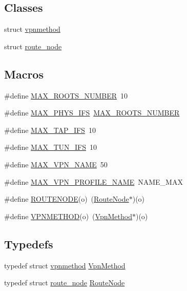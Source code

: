 \subsection*{Classes}
\begin{DoxyCompactItemize}
\item 
struct \hyperlink{structvpnmethod}{vpnmethod}
\item 
struct \hyperlink{structroute__node}{route\+\_\+node}
\end{DoxyCompactItemize}
\subsection*{Macros}
\begin{DoxyCompactItemize}
\item 
\#define \hyperlink{route-tree_8h_a8e1da3af3417de420798c8b448b6a8cb}{M\+A\+X\+\_\+\+R\+O\+O\+T\+S\+\_\+\+N\+U\+M\+B\+ER}~10
\item 
\#define \hyperlink{route-tree_8h_a5f66955385e84e67789d731b5cad24c7}{M\+A\+X\+\_\+\+P\+H\+Y\+S\+\_\+\+I\+FS}~\hyperlink{route-tree_8h_a8e1da3af3417de420798c8b448b6a8cb}{M\+A\+X\+\_\+\+R\+O\+O\+T\+S\+\_\+\+N\+U\+M\+B\+ER}
\item 
\#define \hyperlink{route-tree_8h_a82e5e4b05dda947b534dc0941ad418ba}{M\+A\+X\+\_\+\+T\+A\+P\+\_\+\+I\+FS}~10
\item 
\#define \hyperlink{route-tree_8h_a0d314d64c79d675bd2614b20e738d527}{M\+A\+X\+\_\+\+T\+U\+N\+\_\+\+I\+FS}~10
\item 
\#define \hyperlink{route-tree_8h_a77ed9a5f9670b7a2d69c376d1199eddf}{M\+A\+X\+\_\+\+V\+P\+N\+\_\+\+N\+A\+ME}~50
\item 
\#define \hyperlink{route-tree_8h_ab6867a2365732ebd41ddf7459525d032}{M\+A\+X\+\_\+\+V\+P\+N\+\_\+\+P\+R\+O\+F\+I\+L\+E\+\_\+\+N\+A\+ME}~N\+A\+M\+E\+\_\+\+M\+AX
\item 
\#define \hyperlink{route-tree_8h_ab4431a377dee3e169cfe060fe7666758}{R\+O\+U\+T\+E\+N\+O\+DE}(o)~(\hyperlink{route-tree_8h_a1296be44c6672a1adb94ba6dc416682c}{Route\+Node}$\ast$)(o)
\item 
\#define \hyperlink{route-tree_8h_a58aa26c75d296ca73e2bca481e6e036f}{V\+P\+N\+M\+E\+T\+H\+OD}(o)~(\hyperlink{route-tree_8h_a1034dd038389279bf422489d4d99d43a}{Vpn\+Method}$\ast$)(o)
\end{DoxyCompactItemize}
\subsection*{Typedefs}
\begin{DoxyCompactItemize}
\item 
typedef struct \hyperlink{structvpnmethod}{vpnmethod} \hyperlink{route-tree_8h_a1034dd038389279bf422489d4d99d43a}{Vpn\+Method}
\item 
typedef struct \hyperlink{structroute__node}{route\+\_\+node} \hyperlink{route-tree_8h_a1296be44c6672a1adb94ba6dc416682c}{Route\+Node}
\end{DoxyCompactItemize}
